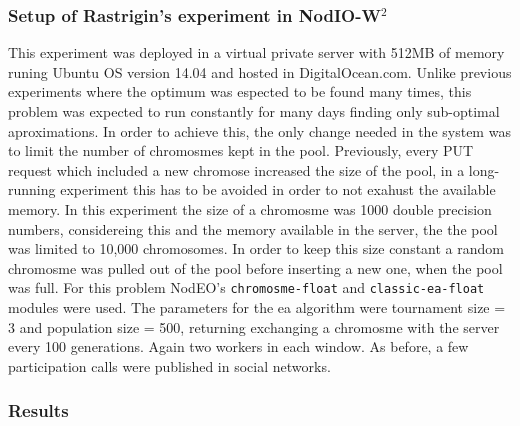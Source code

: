 \documentclass[journal,onecolumn]{IEEEtran}
\begin{document}
\subsubsection{Setup of Rastrigin's experiment in {\sf NodIO}-W$^2$ }
This experiment was deployed in a virtual private server with 512MB of memory
runing Ubuntu OS version 14.04 and hosted in DigitalOcean.com. Unlike previous
experiments where the optimum was espected to be found many times, 
this problem was expected to run constantly for many days finding only
sub-optimal aproximations. In order to achieve this, the only change needed 
in the system was to limit the number of chromosmes kept in the pool. 
Previously, every PUT request which included a new chromose increased 
the size of the pool, in a long-running experiment this has to be avoided
in order to not exahust the available memory. In this experiment the size
of a chromosme was 1000 double precision numbers, considereing this
and the memory available in the server, the the pool was limited 
to 10,000 chromosomes.  In order to keep this size
constant a random chromosme was pulled out of the pool before inserting a
new one, when the pool was full. For this problem {\sf NodEO}'s {\tt chromosme-float} 
and {\tt classic-ea-float} modules were used. The parameters for the ea algorithm 
were tournament size = 3 and  population size = 500, returning exchanging a
chromosme with the server every 100 generations. Again two workers in each window.
As before, a few participation calls were published in social networks.

\subsubsection{Results}
\end{document}
